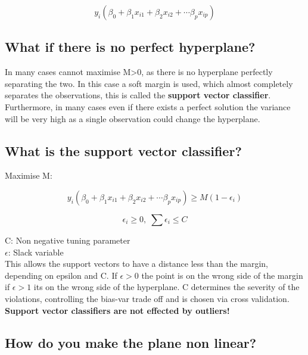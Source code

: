 \documentclass[11pt]{scrartcl} %
\begin{document}
\begin{equation}
	y_i(\beta_0+\beta_1x_{i1}+\beta_2x_{i2}+\cdots \beta_px_{ip})
\end{equation}

\subsection{What if there is no perfect hyperplane?}

In many cases cannot maximise M>0, as there is no hyperplane perfectly separating the two.
In this case a soft margin is used, which almost completely separates the observations, this
is called the \textbf{support vector classifier}.\\

Furthermore, in many cases even if there exists a perfect solution the variance will be very high
as a single observation could change the hyperplane.

\subsection{What is the support vector classifier?}

Maximise M:

\begin{equation}
	y_i(\beta_0+\beta_1x_{i1}+\beta_2x_{i2}+\cdots \beta_px_{ip}) \geq M(1-\epsilon_i)
\end{equation}

\begin{equation}
	\epsilon_i \geq 0,\; \sum \epsilon_i \leq C
\end{equation}

C: Non negative tuning parameter\\
\(\epsilon\): Slack variable \\

This allows the support vectors to have a distance less than the margin, depending on epsilon and
C. If \(\epsilon>0\) the point is on the wrong side of the margin if \(\epsilon>1\) its on the wrong
side of the hyperplane. C determines the severity of the violations, controlling the bias-var
trade off and is chosen via cross validation.\\

\textbf{Support vector classifiers are not effected by outliers!}

\subsection{How do you make the plane non linear?}
\end{document}
